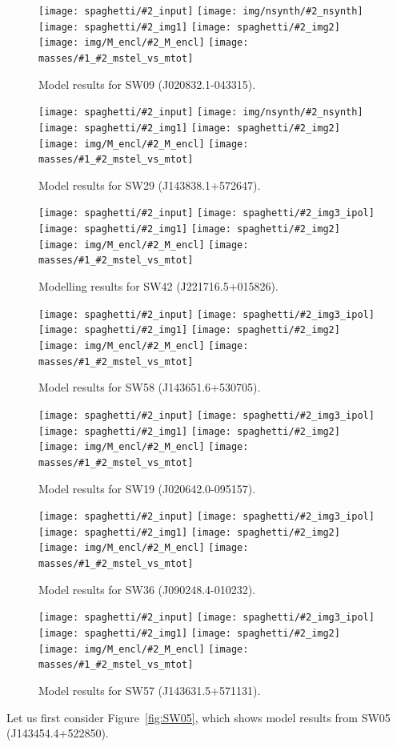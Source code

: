 \documentclass[fleqn,usenatbib]{mnras}
\newcommand{\inclfig}[2]{
  \centering
	\texttt{[image: spaghetti/\#2\_input]}%
	\texttt{[image: spaghetti/\#2\_img3\_ipol]}
	\texttt{[image: spaghetti/\#2\_img1]}%
	\texttt{[image: spaghetti/\#2\_img2]}
	\texttt{[image: img/M\_encl/\#2\_M\_encl]}%
	\texttt{[image: masses/\#1\_\#2\_mstel\_vs\_mtot]}
}
\newcommand{\inclfign}[2]{
  \centering
	\texttt{[image: spaghetti/\#2\_input]}%
	\texttt{[image: img/nsynth/\#2\_nsynth]}
	\texttt{[image: spaghetti/\#2\_img1]}%
	\texttt{[image: spaghetti/\#2\_img2]}
	\texttt{[image: img/M\_encl/\#2\_M\_encl]}%
	\texttt{[image: masses/\#1\_\#2\_mstel\_vs\_mtot]}
}
\newcommand{\figref}[1]{\ref{fig:#1}}
\begin{document}
\begin{figure}
  \inclfign{SW09}{ASW0002asp_5EKMWWVJHL}
  \caption{Model results for SW09 (J020832.1-043315).}
  \label{fig:SW09}
\end{figure}

\begin{figure}
  \inclfign{SW29}{ASW0008qsm_TOFS7JNGEK}
  \caption{Model results for SW29 (J143838.1+572647).}
  \label{fig:SW29}
\end{figure}

\begin{figure}
  \inclfig{SW42}{ASW00096rm_4Q3YCEWGLN}
  \caption{Modelling results for SW42 (J221716.5+015826).}
  \label{fig:SW42}
\end{figure}

\begin{figure}
  \inclfig{SW58}{ASW0007iwp_4XBJWT3COV}
  \caption{Model results for SW58 (J143651.6+530705).}
  \label{fig:SW58}
\end{figure}

\begin{figure}
  \inclfig{SW19}{ASW0001ld7_OS3CYAKLRT}
  \caption{Model results for SW19 (J020642.0-095157).}
  \label{fig:SW19}
\end{figure}


\begin{figure}
  \inclfig{SW36}{ASW000096t_7IPP7LWVOF}
  \caption{Model results for SW36 (J090248.4-010232).}
  \label{fig:SW36}
\end{figure}

\begin{figure}
  \inclfig{SW57}{ASW0008pag_5SXGXQYY6V}
  \caption{Model results for SW57 (J143631.5+571131).}
  \label{fig:SW57}
\end{figure}

Let us first consider Figure~\figref{SW05}, which shows model results
from SW05 (J143454.4+522850).
\end{document}
